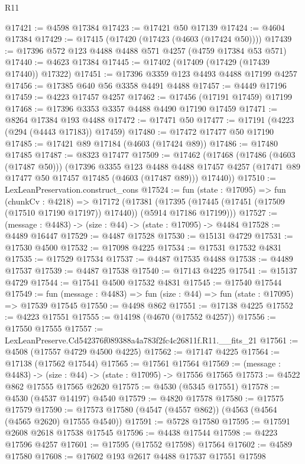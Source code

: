 \begin{lexlean}{R11}
\begin{coremodule}
@17421 := @4598 @17384
@17423 := @17421 @50 @17139
@17424 := @4604 @17384
@17429 := @17415 (@17420 (@17423 (@4603 (@17424 @50))))
@17439 := @17396 @572 @123 @4488 @4488 @571 @4257 (@4759 @17384 @53 @571)
@17440 := @4623 @17384
@17445 := @17402 (@17409 (@17429 (@17439 @17440)) @17322)
@17451 := @17396 @3359 @123 @4493 @4488 @17199 @4257
@17456 := @17385 @640 @56 @3358 @4491 @4488
@17457 := @4449 @17196
@17459 := @4223 @17457 @4257
@17462 := @17456 (@17191 @17459) @17199
@17468 := @17396 @3353 @3357 @4488 @4490 @17190 @17459
@17471 := @8264 @17384 @193 @4488
@17472 := @17471 @50
@17477 := @17191 (@4223 (@294 (@4443 @17183)) @17459)
@17480 := @17472 @17477 @50 @17190
@17485 := @17421 @89 @17184 (@4603 (@17424 @89))
@17486 := @17480 @17485
@17487 := @8323 @17477
@17509 := @17462
    (@17468
      (@17486 (@4603 (@17487 @50)))
      (@17396
        @3355
        @123
        @4488
        @4488
        @17457
        @4257
        (@17471 @89 @17477 @50 @17457 @17485 (@4603 (@17487 @89)))
        @17440))
@17510 := LexLeanPreservation.construct_cons
@17524 := fun (state : @17095) =>
  fun (chunkCv : @4218) =>
  @17172
    (@17381 (@17395 (@17445 (@17451 (@17509 (@17510 @17190 @17197)) @17440)) (@5914 @17186 @17199)))
@17527 := (message : @4483) -> (size : @44) -> (state : @17095) -> @4484
@17528 := @4489 @16447
@17529 := @4487 @17528
@17530 := @15131 @4729
@17531 := @17530 @4500
@17532 := @17098 @4225
@17534 := @17531 @17532 @4831
@17535 := @17529 @17534
@17537 := @4487 @17535 @4488
@17538 := @4489 @17537
@17539 := @4487 @17538
@17540 := @17143 @4225
@17541 := @15137 @4729
@17544 := @17541 @4500 @17532 @4831
@17545 := @17540 @17544
@17549 := fun (message : @4483) => fun (size : @44) => fun (state : @17095) => @17539 @17545
@17550 := @4498 @862
@17551 := @17138 @4225
@17552 := @4223 @17551
@17555 := @14198 (@4670 (@17552 @4257))
@17556 := @17550 @17555
@17557 := LexLeanPreserve.Cd542376f089388a4a783f2fc4c26811f.R11.__fits_21
@17561 := @4508 (@17557 @4729 @4500 @4225)
@17562 := @17147 @4225
@17564 := @17138 (@17562 @17544)
@17565 := @17561 @17564
@17569 := (message : @4483) -> (size : @44) -> (state : @17095) -> @17556 @17565
@17573 := @4522 @862 @17555 @17565 @2620
@17575 := @4530 (@5345 @17551)
@17578 := @4530 (@4537 @14197) @4540
@17579 := @4820 @17578
@17580 := @17575 @17579
@17590 := @17573 @17580 (@4547 (@4557 @862)) (@4563 (@4564 (@4565 @2620) @17555 @4540))
@17591 := @5728 @17580
@17595 := @17591 @2608 @2618 @17538 @17545
@17596 := @4438 @17544
@17598 := @4223 @17596 @4257
@17601 := @17595 (@17552 @17598) @17564
@17602 := @4589 @17580
@17608 := @17602 @193 @2617 @4488 @17537 @17551 @17598

\end{coremodule}
\end{lexlean}
